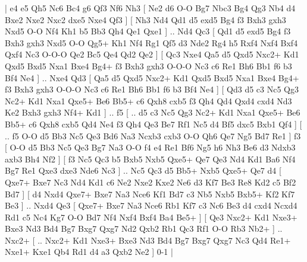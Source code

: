 \makegametitle 
|   e4   e5    Qh5   Nc6    Bc4   g6    Qf3   Nf6    Nh3 [  Ne2 d6  O-O Bg7  Nbc3 Bg4  Qg3 Nb4  d4 Bxe2  Nxe2 Nxc2  dxe5 Nxe4  Qf3   ]  [  Nh3 Nd4  Qd1 d5  exd5 Bg4  f3 Bxh3  gxh3 Nxd5  O-O Nf4  Kh1 b5  Bb3 Qh4  Qe1 Qxe1   ] .. Nd4    Qc3 [  Qd1 d5  exd5 Bg4  f3 Bxh3  gxh3 Nxd5  O-O Qg5+  Kh1 Nf4  Rg1 Qf5  d3 Nde2  Rg4 h5  Rxf4 Nxf4  Bxf4 Qxf4  Nc3 O-O-O  Qe2 Bc5  Qe4 Qd2  Qe2   ]  [  Qc3 Nxe4  Qa5 d5  Qxd5 Nxc2+  Kd1 Qxd5  Bxd5 Nxa1  Bxe4 Bg4+  f3 Bxh3  gxh3 O-O-O  Nc3 c6  Re1 Bh6  Bb1 f6  b3 Bf4  Ne4   ] .. Nxe4    Qd3 [  Qa5 d5  Qxd5 Nxc2+  Kd1 Qxd5  Bxd5 Nxa1  Bxe4 Bg4+  f3 Bxh3  gxh3 O-O-O  Nc3 c6  Re1 Bh6  Bb1 f6  b3 Bf4  Ne4   ]  [  Qd3 d5  c3 Nc5  Qg3 Nc2+  Kd1 Nxa1  Qxe5+ Be6  Bb5+ c6  Qxh8 cxb5  f3 Qh4  Qd4 Qxd4  cxd4 Nd3  Ke2 Bxh3  gxh3 Nf4+  Kd1   ] .. f5 [ .. d5  c3 Nc5  Qg3 Nc2+  Kd1 Nxa1  Qxe5+ Be6  Bb5+ c6  Qxh8 cxb5  Qd4 Ne4  f3 Qh4  Qe3 Be7  Rf1 Nc5  d4 Bf5  dxc5 Bxb1  Qf4   ]  [ .. f5  O-O d5  Bb3 Nc5  Qe3 Bd6  Na3 Ncxb3  cxb3 O-O  Qh6 Qe7  Ng5 Bd7  Re1   ]  f3 [  O-O d5  Bb3 Nc5  Qe3 Bg7  Na3 O-O  f4 e4  Re1 Bf6  Ng5 h6  Nh3 Be6  d3 Ndxb3  axb3 Bh4  Nf2   ]  [  f3 Nc5  Qc3 b5  Bxb5 Nxb5  Qxe5+ Qe7  Qe3 Nd4  Kd1 Ba6  Nf4 Bg7  Re1 Qxe3  dxe3 Nde6  Nc3   ] .. Nc5    Qc3   d5    Bb5+   Nxb5    Qxe5+   Qe7    d4 [  Qxe7+ Bxe7  Nc3 Nd4  Kd1 c6  Ne2 Nxe2  Kxe2 Ne6  d3 Kf7  Be3 Re8  Kd2 c5  Bf2 Bd7   ]  [  d4 Nxd4  Qxe7+ Bxe7  Na3 Nce6  Kf1 Bd7  c3 Nb5  Nxb5 Bxb5+  Kf2 Kf7  Be3   ] .. Nxd4    Qe3 [  Qxe7+ Bxe7  Na3 Nce6  Rb1 Kf7  c3 Nc6  Be3 d4  cxd4 Ncxd4  Rd1 c5  Nc4 Kg7  O-O Bd7  Nf4 Nxf4  Bxf4 Ba4  Be5+   ]  [  Qe3 Nxc2+  Kd1 Nxe3+  Bxe3 Nd3  Bd4 Bg7  Bxg7 Qxg7  Nd2 Qxb2  Rb1 Qc3  Rf1 O-O  Rb3 Nb2+   ] .. Nxc2+    [ .. Nxc2+  Kd1 Nxe3+  Bxe3 Nd3  Bd4 Bg7  Bxg7 Qxg7  Nc3 Qd4  Re1+ Nxe1+  Kxe1 Qb4  Rd1 d4  a3 Qxb2  Ne2   ] 0-1  |
